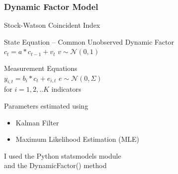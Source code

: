 \documentclass{beamer}
\begin{document}
\begin{frame}
	\frametitle{Dynamic Factor Model}
	
	Stock-Watson  Coincident Index
	
\medskip
State Equation -- Common Unobserved Dynamic Factor	\\

\hspace{.25in} 
$ c_{t} = a * c_{t-1} + v_{t} $  
\hspace{.25in} 
$  v \sim \mathcal{N}(0,1)  $
	
\medskip
Measurement Equations 	\\

\hspace{.25in} 
$ y_{i,t} =  b_{i} * c_{t} + e_{i,t}  $
\hspace{.25in} 
$  e \sim \mathcal{N}(0,\Sigma)  $
\\

\hspace{.25in} 
for $i = 1,2, .. K$ indicators
	
\medskip
Parameters estimated using 
\begin{itemize}
	\item 
	Kalman Filter
	\item 
	Maximum Likelihood Estimation (MLE)
\end{itemize}
	
\medskip
I used the Python statsmodels module \\
and the DynamicFactor() method

\end{frame}
\end{document}
